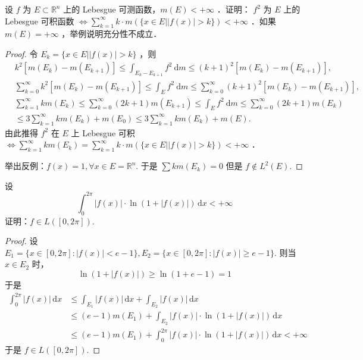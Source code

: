 \begin{exercise}
设 $f$ 为 $E \subset \mathbb{R}^n$ 上的 Lebesgue 可测函数，$m(E)<+\infty$ ．证明：
$f^2$ 为 $E$ 上的 Lebesgue 可积函数 $\Leftrightarrow \sum_{k=1}^{\infty} k \cdot m(\{x \in E| | f(x) \mid>k\})<+\infty$ ．如果 $m(E)=+\infty$ ，举例说明充分性不成立．
\end{exercise}
\begin{proof}

令 $E_k=\{x \in E| | f(x) \mid>k\}$ ，则
\[
\begin{aligned}
& k^2\left[m\left(E_k\right)-m\left(E_{k+1}\right)\right] \leqslant \int_{E_k-E_{k+1}} f^2 \mathrm{~d} m \leqslant(k+1)^2\left[m\left(E_k\right)-m\left(E_{k+1}\right)\right], \\
& \sum_{k=0}^{\infty} k^2\left[m\left(E_k\right)-m\left(E_{k+1}\right)\right] \leqslant \int_E f^2 \mathrm{~d} m \leqslant \sum_{k=0}^{\infty}(k+1)^2\left[m\left(E_k\right)-m\left(E_{k+1}\right)\right], \\
& \sum_{k=1}^{\infty} k m\left(E_k\right) \leqslant \sum_{k=0}^{\infty}(2 k+1) m\left(E_{k+1}\right) \leqslant \int_E f^2 \mathrm{~d} m \leqslant \sum_{k=0}^{\infty}(2 k+1) m\left(E_k\right) \\
& \leqslant 3 \sum_{k=1}^{\infty} k m\left(E_k\right)+m\left(E_0\right) \leqslant 3 \sum_{k=1}^{\infty} k m\left(E_k\right)+m(E) .
\end{aligned}
\]
由此推得
$f^2$ 在 $E$ 上 Lebesgue 可积 $\Leftrightarrow \sum_{k=1}^{\infty} k m\left(E_k\right)=\sum_{k=1}^{\infty} k \cdot m(\{x \in E| | f(x) \mid>k\})<+\infty$ ．

举出反例：$f (x)=1,\forall x\in E=\mathbb{R}^{n}$. 于是 $\sum km(E_k)=0$ 但是 $f\not\in L^2(E)$.
\end{proof}

\begin{exercise}
设
\[
\int_{0}^{2\pi} \lvert f(x) \rvert \cdot \ln(1+\lvert f(x) \rvert ) \, \mathrm{d}x <+\infty
\]
证明：$f\in L([0,2\pi])$.
\end{exercise}
\begin{proof}
设 $E_1=\{ x\in[0,2\pi]:\lvert f(x) \rvert<e-1 \},E_2=\{ x\in[0,2\pi]:\lvert f(x) \rvert\geq e-1 \}$. 则当 $x\in E_2$ 时，
\[
\ln(1+\lvert f(x) \rvert )\geq \ln(1+e-1)=1
\]
于是
\[
\begin{aligned}
\int_{0}^{2\pi} \lvert f(x) \rvert  \, \mathrm{d}x  & \leq \int_{E_1}^{ } \lvert f(x) \rvert  \, \mathrm{d}x +\int_{E_2}^{} \lvert f(x) \rvert  \, \mathrm{d}x  \\
 & \leq (e-1)m(E_1)+\int_{E_2}^{ } \lvert f(x) \rvert \cdot \ln(1+\lvert f(x) \rvert ) \, \mathrm{d}x  \\
 & \leq (e-1)m(E_1)+\int_{0}^{2\pi} \lvert f(x) \rvert \cdot \ln(1+\lvert f(x) \rvert ) \, \mathrm{d}x <+\infty
\end{aligned}
\]
于是 $f\in L([0,2\pi])$.

\end{proof}

